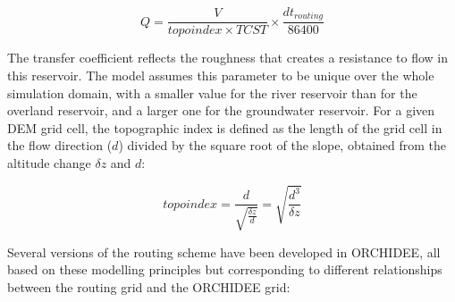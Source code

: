 \begin{equation}
    Q = \frac{V}{topoindex \times TCST} \times \frac{dt_{routing}}{86400}
\end{equation}

The transfer coefficient reflects the roughness that creates a resistance to flow in this reservoir. The model assumes this parameter to be unique over the whole simulation domain, with a smaller value for the river reservoir than for the overland reservoir, and a larger one for the groundwater reservoir.
For a given DEM grid cell, the topographic index is defined as the length of the grid cell in the flow direction ($d$) divided by the square root of the slope, obtained from the altitude change $\delta z$ and $d$:

\begin{equation}
    topoindex = \frac{d}{\sqrt{\frac{\delta z}{d}}} = \sqrt{ \frac{d^3}{\delta z} } 
\end{equation}

\hfill

Several versions of the routing scheme have been developed in ORCHIDEE, all based on these modelling principles but corresponding to different relationships between the routing grid and the ORCHIDEE grid:


